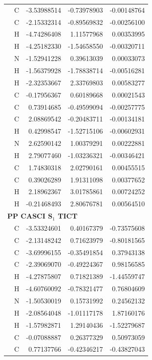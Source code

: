 \begin{longtable}{llrrr}
 & C & -3.53988514 & -0.73978903 & -0.00148764 \\
 & C & -2.15332314 & -0.89569832 & -0.00256100 \\
 & H & -4.74286408 &  1.11577968 &  0.00353995 \\
 & H & -4.25182330 & -1.54658550 & -0.00320711 \\
 & N & -1.52941228 &  0.39613039 &  0.00033073 \\
 & H & -1.56379928 & -1.78838714 & -0.00516281 \\
 & H & -2.32353667 &  2.33769803 &  0.00583277 \\
 & C & -0.17956367 &  0.60189668 &  0.00021543 \\
 & C &  0.73914685 & -0.49599094 & -0.00257775 \\
 & C &  2.08869542 & -0.20483711 & -0.00134181 \\
 & H &  0.42998547 & -1.52715106 & -0.00602931 \\
 & N &  2.62590142 &  1.00379291 &  0.00222881 \\
 & H &  2.79077460 & -1.03236321 & -0.00346421 \\
 & C &  1.74830318 &  2.02790161 &  0.00455515 \\
 & C &  0.39026289 &  1.91311098 &  0.00377652 \\
 & H &  2.18962367 &  3.01785861 &  0.00724252 \\
 & H & -0.21468493 &  2.80676781 &  0.00564510 \\
\multicolumn{5}{l}{\textbf{PP CASCI S$_1$ TICT}}\\
 & C & -3.53324601 &  0.40167379 & -0.73575608 \\
 & C & -2.13148242 &  0.71623979 & -0.80181565 \\
 & C & -3.69996155 & -0.35491854 &  0.37943138 \\
 & C & -2.39069070 & -0.49224367 &  0.98156585 \\
 & H & -4.27875807 &  0.71821389 & -1.44559747 \\
 & H & -4.60760092 & -0.78321477 &  0.76804609 \\
 & N & -1.50530019 &  0.15731992 &  0.24562132 \\
 & H & -2.08564048 & -1.01117178 &  1.87160176 \\
 & H & -1.57982871 &  1.29140436 & -1.52279687 \\
 & C & -0.07088887 &  0.26377329 &  0.50973059 \\
 & C &  0.77137766 & -0.42346217 & -0.43827043 \\

\end{longtable}
